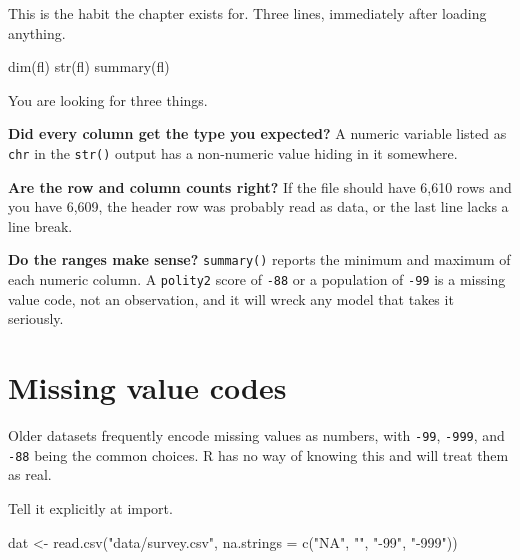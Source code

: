\documentclass[
  a4paper,
]{scrbook}
\newenvironment{Shaded}{\begin{snugshade}}{\end{snugshade}}
\newcommand{\AttributeTok}[1]{\textcolor[rgb]{0.40,0.45,0.13}{#1}}
\newcommand{\FunctionTok}[1]{\textcolor[rgb]{0.28,0.35,0.67}{#1}}
\newcommand{\NormalTok}[1]{\textcolor[rgb]{0.00,0.23,0.31}{#1}}
\newcommand{\OtherTok}[1]{\textcolor[rgb]{0.00,0.23,0.31}{#1}}
\newcommand{\StringTok}[1]{\textcolor[rgb]{0.13,0.47,0.30}{#1}}
\begin{document}

This is the habit the chapter exists for. Three lines, immediately after
loading anything.

\begin{Shaded}
\begin{Highlighting}[]
\FunctionTok{dim}\NormalTok{(fl)}
\FunctionTok{str}\NormalTok{(fl)}
\FunctionTok{summary}\NormalTok{(fl)}
\end{Highlighting}
\end{Shaded}

You are looking for three things.

\textbf{Did every column get the type you expected?} A numeric variable
listed as \texttt{chr} in the \texttt{str()} output has a non-numeric
value hiding in it somewhere.

\textbf{Are the row and column counts right?} If the file should have
6,610 rows and you have 6,609, the header row was probably read as data,
or the last line lacks a line break.

\textbf{Do the ranges make sense?} \texttt{summary()} reports the
minimum and maximum of each numeric column. A \texttt{polity2} score of
\texttt{-88} or a population of \texttt{-99} is a missing value code,
not an observation, and it will wreck any model that takes it seriously.

\section*{Missing value codes}\label{missing-value-codes}


Older datasets frequently encode missing values as numbers, with
\texttt{-99}, \texttt{-999}, and \texttt{-88} being the common choices.
R has no way of knowing this and will treat them as real.

Tell it explicitly at import.

\begin{Shaded}
\begin{Highlighting}[]
\NormalTok{dat }\OtherTok{\textless{}{-}} \FunctionTok{read.csv}\NormalTok{(}\StringTok{"data/survey.csv"}\NormalTok{, }\AttributeTok{na.strings =} \FunctionTok{c}\NormalTok{(}\StringTok{"NA"}\NormalTok{, }\StringTok{""}\NormalTok{, }\StringTok{"{-}99"}\NormalTok{, }\StringTok{"{-}999"}\NormalTok{))}
\end{Highlighting}
\end{Shaded}
\end{document}
